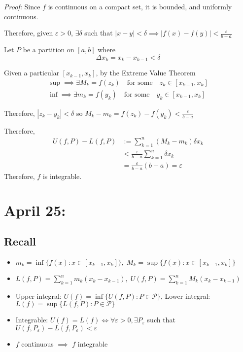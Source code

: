 \documentclass[12pt]{report}
\newcommand{\abs}[1]{\left\vert #1 \right\vert}
\newcommand{\ep}{\varepsilon}
\newenvironment*{tbox}[2][gray]{
    \begin{tcolorbox}[
        parbox=false,
        colback=#1!5!white,
        colframe=#1!75!black,
        breakable,
        title={#2}
    ]}
    {\end{tcolorbox}}
\begin{document}
    \begin{tbox}{\textbf{Theorem:} If $f$ is continuous on $[a, b]$ then it is integrable. }
        \emph{Proof:} Since $f$ is continuous on a compact set, it is bounded, and uniformly continuous. 

        Therefore, given $\ep > 0$, $\exists \delta$ such that $\abs{x - y} < \delta \implies \abs{f(x) - f(y)} < \frac{\ep}{b - a}$

        Let $P$ be a partition on $[a, b]$ where 
        \[\Delta x_k = x_k - x_{k-1} < \delta\] 

        Given a particular $[x_{k-1}, x_k]$, by the Extreme Value Theorem 
        \begin{align*}
            \sup \implies \exists M_k = f(z_k) \quad \text{for some} \quad z_k \in [x_{k-1}, x_k]\\ 
            \inf \implies \exists m_k = f(y_k) \quad \text{for some} \quad y_k \in [x_{k-1}, x_k]
        \end{align*}

        Therefore, $\abs{z_k - y_k} < \delta$ so $M_k - m_k = f(z_k) - f(y_k) < \frac{\ep}{b - a}$

        Therefore, 
        \begin{align*}
            U(f, P) - L(f, P) &:= \sum_{k=1}^n (M_k - m_k) \delta x_k\\ 
            &< \frac{\ep}{b - a} \sum_{k=1}^n \delta x_k\\ 
            &= \frac{\ep}{b - a} (b - a) = \ep
        \end{align*}
        Therefore, $f$ is integrable.
    \end{tbox}

\section{April 25:}
    \subsection*{Recall} 
        \begin{itemize}
            \item $m_k = \inf\{f(x): x \in [x_{k-1}, x_k]\},\; M_k = \sup\{f(x): x \in [x_{k-1}, x_k]\}$
            \item $L(f, P) = \sum_{k=1}^n m_k(x_k - x_{k-1}),\; U(f, P) = \sum_{k=1}^n M_k(x_k - x_{k-1})$
            \item Upper integral: $U(f) = \inf\{U(f, P): P \in \mathcal{P}\}$, Lower integral: $L(f) = \sup\{L(f, P): P \in \mathcal{P}\}$
            \item Integrable: $U(f) = L(f) \iff \forall \ep > 0, \exists P_{\ep}$ such that $U(f, P_{\ep}) - L(f, P_{\ep}) < \ep$
            \item $f$ continuous $\implies$ $f$ integrable
        \end{itemize}
\end{document}
